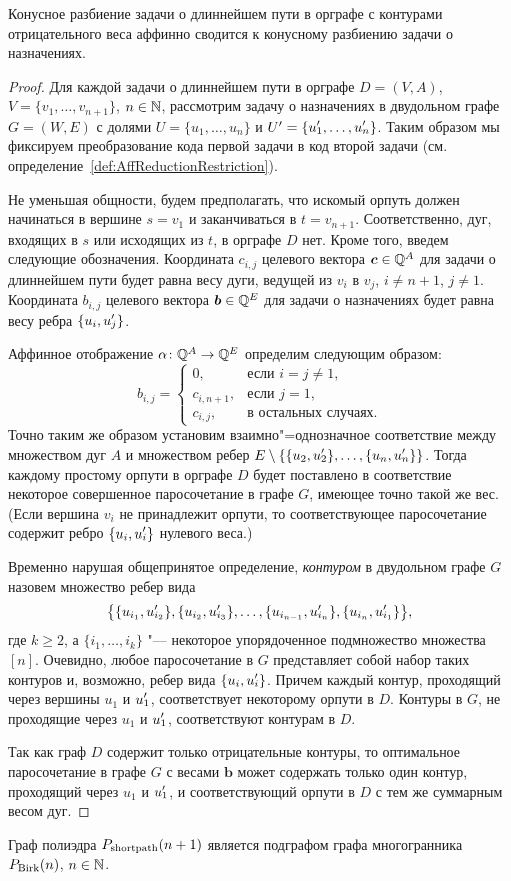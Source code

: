 \begin{theorem}
Конусное разбиение задачи о длиннейшем пути в орграфе с контурами отрицательного веса аффинно сводится к конусному разбиению задачи о назначениях.
\end{theorem}
\begin{proof}
\newcommand{\us}{u\lefteqn{'}}
Для каждой задачи о длиннейшем пути в орграфе $D = (V, A)$, $V = \{v_1, \dots, v_{n+1}\}$, $n\in \mathbb{N}$, рассмотрим задачу о назначениях в двудольном графе $G = (W,E)$ с долями $U = \{u_1, \dots, u_n\}$ и $U' = \{\us_1, \dots, \us_n\}$.
Таким образом мы фиксируем преобразование кода первой задачи в код второй задачи (см. определение~\ref{def:AffReductionRestriction}).

Не уменьшая общности, будем предполагать, что искомый орпуть должен начинаться в вершине $s = v_1$ и заканчиваться в $t = v_{n+1}$. 
Соответственно, дуг, входящих в $s$ или исходящих из $t$, в орграфе $D$ нет.
Кроме того, введем следующие обозначения. Координата $c_{i,j}$ целевого вектора $\bm{c} \in \mathbb{Q}^{A}$ для задачи о длиннейшем пути будет равна весу дуги, ведущей из $v_i$ в $v_j$, $i \ne n+1$, $j \ne 1$.
Координата $b_{i,j}$ целевого вектора $\bm{b} \in \mathbb{Q}^{E}$ для задачи о назначениях будет равна весу ребра $\{u_i, \us_j\}$.

Аффинное отображение $\alpha\colon \mathbb{Q}^{A} \to \mathbb{Q}^{E}$ определим следующим образом:
\[
b_{i,j} = \begin{cases}
0, & \text{если } i = j \ne 1,\\
c_{i,n+1}, & \text{если } j = 1,\\
c_{i,j}, & \text{в остальных случаях}.
\end{cases}
\]
Точно таким же образом установим взаимно"=однозначное соответствие между множеством дуг $A$ и множеством ребер $E \setminus \{\{u_2, \us_2\},\dots,\{u_n, \us_n\}\}$.
Тогда каждому простому орпути в орграфе $D$ будет поставлено в соответствие некоторое совершенное паросочетание в графе $G$, имеющее точно такой же вес.
(Если вершина $v_i$ не принадлежит орпути, то соответствующее паросочетание содержит ребро $\{u_i, \us_i\}$ нулевого веса.)

Временно нарушая общепринятое определение, \emph{контуром} в двудольном графе $G$ назовем множество ребер вида
\[
\bigl\{\{u_{i_1}, \us_{i_2}\},\{u_{i_2}, \us_{i_3}\},\dots,\{u_{i_{n-1}}, \us_{i_n}\},\{u_{i_n}, \us_{i_1}\}\bigr\},
\]
где $k \ge 2$, а $\{i_1, \dots, i_k\}$ "--- некоторое упорядоченное подмножество множества $[n]$.
Очевидно, любое паросочетание в $G$ представляет собой набор таких контуров и, возможно, ребер вида $\{u_i, \us_i\}$.
Причем каждый контур, проходящий через вершины $u_1$ и $\us_1$, соответствует некоторому орпути в $D$.
Контуры в $G$, не проходящие через $u_1$ и $\us_1$, соответствуют контурам в $D$.

Так как граф $D$ содержит только отрицательные контуры, то оптимальное паросочетание в графе $G$ с весами $\bm{b}$ может содержать только один контур, проходящий через $u_1$ и $\us_1$, и соответствующий орпути в $D$ с тем же суммарным весом дуг.
\end{proof}

\begin{corollary}
\label{cor:Short2Assign}
Граф полиэдра $P_{\textup{shortpath}}(n+1)$ является подграфом графа многогранника $P_{\textup{Birk}}(n)$, $n \in \mathbb{N}$.
\end{corollary}

%
%
